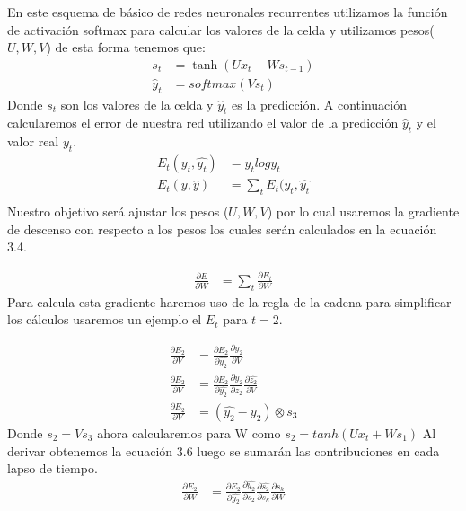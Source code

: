 En este esquema de básico de redes neuronales recurrentes utilizamos la función de activación softmax para calcular los valores de la celda y utilizamos pesos($U,W,V$) de esta forma tenemos que:
\begin{equation}
	\label{ST}
	\begin{aligned}
	s_{t}&=\tanh(Ux_{t}+Ws_{t-1})\\
	\hat{y}_{t}&=softmax(Vs_{t})
	\end{aligned}
\end{equation}
Donde $s_{t}$ son los valores de la celda y $\hat{y}_{t}$ es la predicción. A continuación calcularemos el error de nuestra red utilizando el valor de la predicción $\hat{y}_{t}$ y el valor real $y_{t}$.
\begin{equation}
	\label{STs}
	\begin{aligned}
		E_{t}(y_{t},\hat{y_{t}})&=y_{t}logy_{t}\\
		E_{t}(y,\hat{y})&=\sum_{t}{E_{t}(y_{t},\hat{y_{t}}}\\
	\end{aligned}
\end{equation}
Nuestro objetivo será ajustar los pesos ($U,W,V$) por lo cual usaremos la gradiente de descenso con respecto a los pesos los cuales serán calculados en la ecuación 3.4.

\begin{equation}
\label{Ts}
\begin{aligned}
	\frac{\partial E}{\partial W}&=\sum_{t}{\frac{\partial E_{t}}{\partial W}}
\end{aligned}
\end{equation}
Para calcula esta gradiente haremos uso de la regla de la cadena para simplificar los cálculos usaremos un ejemplo el $E_{t}$ para $t=2$.


\begin{equation}
\label{Tsfs}
	\begin{aligned}
	\frac{\partial E_{2}}{\partial V}&=\frac{\partial E_{2}}{\partial \hat{y_{2}}} \frac{\partial \hat{y_{2}}}{\partial V}\\
	\frac{\partial E_{2}}{\partial V}&=\frac{\partial E_{2}}{\partial \hat{y_{2}}} \frac{\partial \hat{y_{2}}}{\partial z_{2}} \frac{\partial \hat{z_{2}}}{\partial V}\\
	\frac{\partial E_{2}}{\partial V}&=(\hat{y_{2}}-y_{2})\otimes s_{3}
	\end{aligned}
\end{equation}
Donde $s_{2}=Vs_{3}$ ahora calcularemos para W como $s_{2}=tanh(Ux_{t}+ Ws_{1})$
Al derivar obtenemos la ecuación 3.6 luego se sumarán las contribuciones en cada lapso de tiempo.
\begin{equation}
\label{TsSfs}
	\begin{aligned}
		\frac{\partial E_{2}}{\partial W}&=\frac{\partial E_{2}}{\partial \hat{y_{2}}} \frac{\partial \hat{y_{2}}}{\partial s_{2}} \frac{\partial \hat{s_{2}}}{\partial s_{k}} \frac{\partial s_{k}}{\partial W}
	\end{aligned}
\end{equation}


